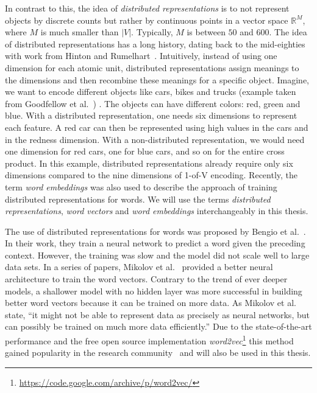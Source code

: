 \documentclass[
        a4paper,
        titlepage,
        twoside,
        parskip,
        numbers=noenddot
        ]{scrbook}
\theoremstyle{break}
\begin{document}
In contrast to this, the idea of \emph{distributed representations} is to not represent objects by discrete counts but rather by continuous points in a vector space $\mathbb{R}^M$, where $M$ is much smaller than $|V|$.
Typically, $M$ is between $50$ and $600$.
The idea of distributed representations has a long history, dating back to the mid-eighties with work from Hinton and Rumelhart~\cite{Hinton1986,Rumelhart1988}.
Intuitively, instead of using one dimension for each atomic unit, distributed representations assign meanings to the dimensions and then recombine these meanings for a specific object.
Imagine, we want to encode different objects like cars, bikes and trucks (example taken from Goodfellow et al.~\cite{Goodfellow2016}) .
The objects can have different colors: red, green and blue.
With a distributed representation, one needs six dimensions to represent each feature.
A red car can then be represented using high values in the cars and in the redness dimension.
With a non-distributed representation, we would need one dimension for red cars, one for blue cars, and so on for the entire cross product.
In this example, distributed representations already require only six dimensions compared to the nine dimensions of 1-of-V encoding.
Recently, the term \emph{word embeddings} was also used to describe the approach of training distributed representations for words.
We will use the terms \emph{distributed representations}, \emph{word vectors} and \emph{word embeddings} interchangeably in this thesis.

The use of distributed representations for words was proposed by Bengio et al.~\cite{Bengio2003}.
In their work, they train a neural network to predict a word given the preceding context.
However, the training was slow and the model did not scale well to large data sets.
In a series of papers, Mikolov et al.~\cite{Mikolov2013b,Mikolov2013,Mikolov2013a} provided a better neural architecture to train the word vectors.
Contrary to the trend of ever deeper models, a shallower model with no hidden layer was more successful in building better word vectors because it can be trained on more data.
As Mikolov et al.~\cite{Mikolov2013a} state, ``it might not be able to represent data as precisely as neural networks, but can possibly be trained on much more data efficiently.''
Due to the state-of-the-art performance and the free open source implementation \emph{word2vec}\footnote{\url{https://code.google.com/archive/p/word2vec/}} this method gained popularity in the research community~\cite{Baroni2014,Goth2016,Navigli2015} and will also be used in this thesis.
\end{document}
